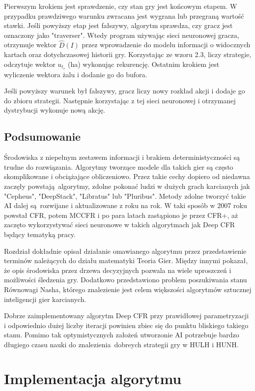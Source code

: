 \documentclass[12pt,oneside,a4paper]{report}
\begin{document}
Pierwszym krokiem jest sprawdzenie, czy stan gry jest końcowym etapem. W przypadku prawdziwego 
warunku zwracana jest wygrana lub przegraną wartość stawki. 
Jeśli powyższy etap jest fałszywy, algorytm sprawdza, czy gracz jest oznaczony jako "traverser".
Wtedy program używając sieci neuronowej gracza,
otrzymuje wektor $\hat{D}(I)$ przez wprowadzenie do modelu informacji o widocznych kartach oraz
dotychczasowej historii gry. Korzystając ze wzoru 2.3, liczy strategie, odczytuje wektor $u_{t_{r}}$ (ha) 
wykonując rekurencję. Ostatnim krokiem jest wyliczenie wektora żalu i dodanie go do bufora.

Jeśli powyższy warunek był fałszywy, gracz liczy nowy rozkład
akcji i dodaje go do zbioru strategii. Następnie korzystając z tej sieci neuronowej i otrzymanej 
dystrybucji wykonuje nową akcję.


\section{Podsumowanie}

Środowiska z niepełnym zestawem informacji i brakiem deterministyczności są trudne do rozwiązania.
Algorytmy tworzące modele
dla takich gier są często skomplikowane i obciążające obliczeniowo. 
Przez takie cechy dopiero od niedawna zaczęły powstają algorytmy, zdolne pokonać ludzi w 
dużych grach karcianych jak "Cepheus", "DeepStack", "Libratus" lub "Pluribus". 
Metody zdolne tworzyć takie AI dalej są rozwijane i aktualizowane z roku na rok.
W taki sposób w 2007 roku powstał CFR, potem MCCFR i po para latach zastąpiono je przez CFR+, aż 
zaczęto wykorzystywać sieci neuronowe w takich algorytmach jak 
Deep CFR będący tematyką pracy. 

Rozdział dokładnie opisał działanie omawianego algorytmu
przez przedstawienie terminów należących do działu matematyki Teoria Gier. Między innymi
 pokazał, że opis środowiska przez drzewa decyzyjnych pozwala na wiele uproszczeń i możliwości
 śledzenia gry. Dodatkowo przedstawiono problem poszukiwania stanu Równowagi Nasha, którego
 znalezienie jest celem większości algorytmów sztucznej inteligencji gier karcianych.

Dobrze zaimplementowany algorytm Deep CFR przy prawidłowej parametryzacji i odpowiednio dużej
liczby iteracji powinien zbiec się do punktu bliskiego takiego stanu. Pomimo tak optymistycznych 
założeń utworzonie AI potrzebuje bardzo długiego czasu nauki do 
znalezienia dobreych strategii gry w HULH i HUNH.


\chapter{Implementacja algorytmu} 
\end{document}
